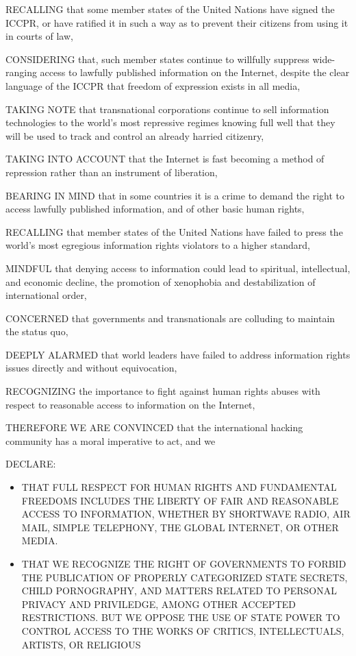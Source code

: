 \documentclass[letterpaper,12pt,english]{sphinxmanual}
\begin{document}
RECALLING that some member states of the United Nations have signed the ICCPR, or have ratified it in such a way as to prevent their citizens from using it in courts of law,

CONSIDERING that, such member states continue to willfully suppress wide-ranging access to lawfully published information on the Internet, despite the clear language of the ICCPR that freedom of expression exists in all media,

TAKING NOTE that transnational corporations continue to sell information technologies to the world's most repressive regimes knowing full well that they will be used to track and control an already harried citizenry,

TAKING INTO ACCOUNT that the Internet is fast becoming a method of
repression rather than an instrument of liberation,

BEARING IN MIND that in some countries it is a crime to demand the right to access lawfully published information, and of other basic human rights,

RECALLING that member states of the United Nations have failed to press the world's most egregious information rights violators to a higher standard,

MINDFUL that denying access to information could lead to spiritual, intellectual, and economic decline, the promotion of xenophobia and destabilization of international order,

CONCERNED that governments and transnationals are colluding to maintain the status quo,

DEEPLY ALARMED that world leaders have failed to address information rights issues directly and without equivocation,

RECOGNIZING the importance to fight against human rights abuses with respect to reasonable access to information on the Internet,

THEREFORE WE ARE CONVINCED that the international hacking community has a moral imperative to act, and we

DECLARE:
\begin{itemize}
\item {} 
THAT FULL RESPECT FOR HUMAN RIGHTS AND FUNDAMENTAL FREEDOMS INCLUDES THE LIBERTY OF FAIR AND REASONABLE ACCESS TO INFORMATION, WHETHER BY SHORTWAVE RADIO, AIR MAIL, SIMPLE TELEPHONY, THE GLOBAL INTERNET, OR OTHER MEDIA.

\item {} 
THAT WE RECOGNIZE THE RIGHT OF GOVERNMENTS TO FORBID THE PUBLICATION OF PROPERLY CATEGORIZED STATE SECRETS, CHILD PORNOGRAPHY, AND MATTERS RELATED TO PERSONAL PRIVACY AND PRIVILEDGE, AMONG OTHER ACCEPTED RESTRICTIONS. BUT WE OPPOSE THE USE OF STATE POWER TO CONTROL ACCESS TO THE WORKS OF CRITICS, INTELLECTUALS, ARTISTS, OR RELIGIOUS

\end{itemize}
\end{document}
